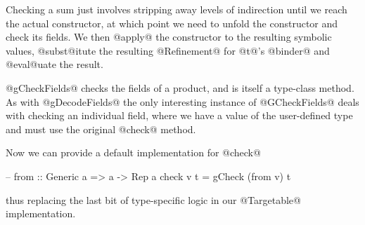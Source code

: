 Checking a sum just involves stripping away levels of indirection until we reach
the actual constructor, at which point we need to unfold the constructor and
check its fields. We then @apply@ the constructor to the resulting symbolic
values, @subst@itute the resulting @Refinement@ for @t@'s @binder@ and
@eval@uate the result.

@gCheckFields@ checks the fields of a product, and is itself a type-class method.
%
As with @gDecodeFields@ the only interesting instance of @GCheckFields@ deals
with checking an individual field, where we have a value of the user-defined
type and must use the original @check@ method.

Now we can provide a default implementation for @check@
%
\begin{code}
  -- from :: Generic a => a -> Rep a
  check v t = gCheck (from v) t
\end{code}
%
thus replacing the last bit of type-specific logic in our @Targetable@
implementation.






